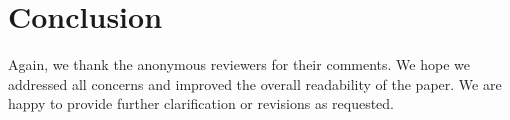 \documentclass{letter}
\begin{document}
\section{Conclusion}

Again, we thank the anonymous reviewers for their comments. We hope we addressed all concerns and improved the overall readability of the paper. We are happy to provide further clarification or revisions as requested.





\small
%


\end{document}

